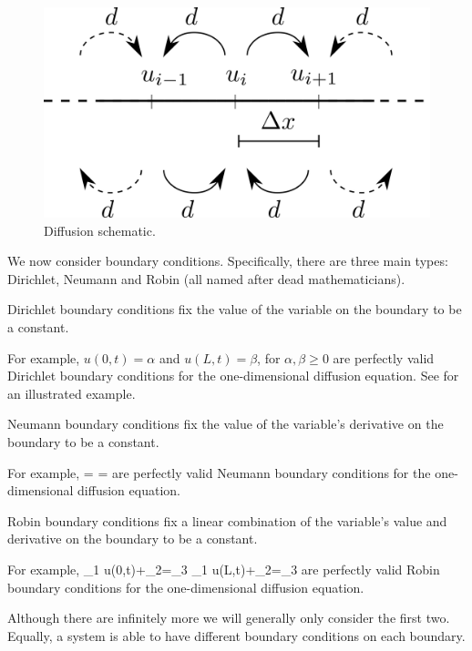 \begin{figure}[!!!h!!!tb]
\centering
\includegraphics[width=\tp]{../Pictures/Schematic_diffusion.png}
\caption{Diffusion schematic. \label{Diffusion_schematic}}
\end{figure}
We now consider boundary conditions. Specifically, there are three main types: Dirichlet, Neumann and Robin (all named after dead mathematicians).
\begin{defin}
Dirichlet boundary conditions fix the value of the variable on the boundary to be a constant.
\end{defin}
For example, $u(0,t)=\alpha$ and $u(L,t)=\beta$, for $\alpha,\beta\geq0$ are perfectly valid Dirichlet boundary conditions for the one-dimensional diffusion equation. See  for an illustrated example.
\begin{defin}
Neumann boundary conditions fix the value of the variable's derivative on the boundary to be a constant.
\end{defin}
For example,
\bb
{}=\alpha \quad{} \quad {}=\beta\label{Neumann}
\ee
are perfectly valid Neumann boundary conditions for the one-dimensional diffusion equation.
\begin{defin}
Robin boundary conditions fix a linear combination of the  variable's value and derivative on the boundary to be a constant.
\end{defin}
For example,
\bb
\alpha_1 u(0,t)+\alpha_2=\alpha_3 \quad{} \quad \beta_1 u(L,t)+\beta_2=\beta_3
\ee
are perfectly valid Robin boundary conditions for the one-dimensional diffusion equation.

Although there are infinitely more we will generally only consider the first two. Equally, a system is able to have different boundary conditions on each boundary.

